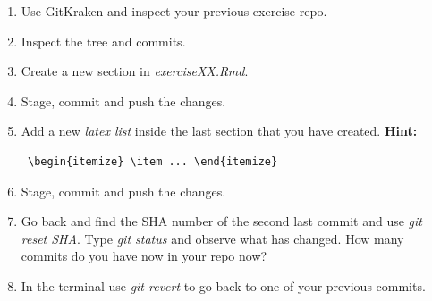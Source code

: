 \documentclass[
]{article}
\providecommand{\tightlist}{%
  \setlength{\itemsep}{0pt}\setlength{\parskip}{0pt}}
\begin{document}
\begin{enumerate}
\def\labelenumi{\arabic{enumi}.}
\tightlist
\item
  Use GitKraken and inspect your previous exercise repo.
\item
  Inspect the tree and commits.
\item
  Create a new section in \emph{exerciseXX.Rmd}.
\item
  Stage, commit and push the changes.
\item
  Add a new \emph{latex list} inside the last section that you have
  created. \textbf{Hint:}

  \begin{verbatim} \begin{itemize} \item ... \end{itemize} \end{verbatim}
\item
  Stage, commit and push the changes.
\item
  Go back and find the SHA number of the second last commit and use
  \emph{git reset SHA}. Type \emph{git status} and observe what has
  changed. How many commits do you have now in your repo now?
\item
  In the terminal use \emph{git revert} to go back to one of your
  previous commits.
\end{enumerate}
\end{document}
